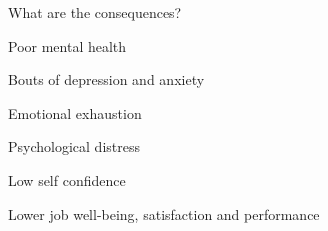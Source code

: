 \documentclass[aspectratio=169]{beamer}
\begin{document}
\begin{frame}
  \begin{center}
    \Huge What are the consequences?
  \end{center}
\end{frame}

\begin{frame}
  \begin{center}
    \Huge Poor mental health
    \\ \small \cite{sakulku11}
  \end{center}
\end{frame}

\begin{frame}
  \begin{center}
    \Huge Bouts of depression and anxiety
    \\ \small \cite{hh15}
  \end{center}
\end{frame}

\begin{frame}
  \begin{center}
    \Huge Emotional exhaustion
    \\ \small \cite{hh15}
  \end{center}
\end{frame}


\begin{frame}
  \begin{center}
    \Huge Psychological distress
    \\ \small \cite{hh15}
  \end{center}
\end{frame}

\begin{frame}
  \begin{center}
    \Huge Low self confidence
    \\ \small \cite{hh15}
  \end{center}
\end{frame}

\begin{frame}
  \begin{center}
    \Huge Lower job well-being, satisfaction and performance
    \\ \small \cite{hh15}
  \end{center}
\end{frame}
\end{document}
